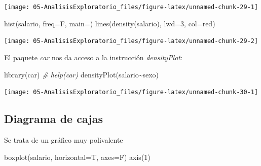 \documentclass[
]{book}
\newenvironment{Shaded}{\begin{snugshade}}{\end{snugshade}}
\newcommand{\AttributeTok}[1]{\textcolor[rgb]{0.77,0.63,0.00}{#1}}
\newcommand{\CommentTok}[1]{\textcolor[rgb]{0.56,0.35,0.01}{\textit{#1}}}
\newcommand{\DecValTok}[1]{\textcolor[rgb]{0.00,0.00,0.81}{#1}}
\newcommand{\FunctionTok}[1]{\textcolor[rgb]{0.00,0.00,0.00}{#1}}
\newcommand{\NormalTok}[1]{#1}
\newcommand{\SpecialCharTok}[1]{\textcolor[rgb]{0.00,0.00,0.00}{#1}}
\newcommand{\StringTok}[1]{\textcolor[rgb]{0.31,0.60,0.02}{#1}}
\theoremstyle{break}
\theoremstyle{nonumberplain}
\begin{document}
\begin{center}\texttt{[image: 05-AnalisisExploratorio\_files/figure-latex/unnamed-chunk-29-1]} \end{center}

\begin{Shaded}
\begin{Highlighting}[]
\FunctionTok{hist}\NormalTok{(salario, }\AttributeTok{freq=}\NormalTok{F, }\AttributeTok{main=}\StringTok{\textquotesingle{}\textquotesingle{}}\NormalTok{)}
\FunctionTok{lines}\NormalTok{(}\FunctionTok{density}\NormalTok{(salario), }\AttributeTok{lwd=}\DecValTok{3}\NormalTok{, }\AttributeTok{col=}\StringTok{\textquotesingle{}red\textquotesingle{}}\NormalTok{)}
\end{Highlighting}
\end{Shaded}

\begin{center}\texttt{[image: 05-AnalisisExploratorio\_files/figure-latex/unnamed-chunk-29-2]} \end{center}

El paquete \emph{car} nos da acceso a la instrucción \emph{densityPlot}:

\begin{Shaded}
\begin{Highlighting}[]
\FunctionTok{library}\NormalTok{(car)  }\CommentTok{\# help(car)}
\FunctionTok{densityPlot}\NormalTok{(salario}\SpecialCharTok{\textasciitilde{}}\NormalTok{sexo)}
\end{Highlighting}
\end{Shaded}

\begin{center}\texttt{[image: 05-AnalisisExploratorio\_files/figure-latex/unnamed-chunk-30-1]} \end{center}

\hypertarget{diagrama-de-cajas}{%
\subsection{Diagrama de cajas}\label{diagrama-de-cajas}}

Se trata de un gráfico muy polivalente

\begin{Shaded}
\begin{Highlighting}[]
\FunctionTok{boxplot}\NormalTok{(salario, }\AttributeTok{horizontal=}\NormalTok{T, }\AttributeTok{axes=}\NormalTok{F)}
\FunctionTok{axis}\NormalTok{(}\DecValTok{1}\NormalTok{)}
\end{Highlighting}
\end{Shaded}
\end{document}
